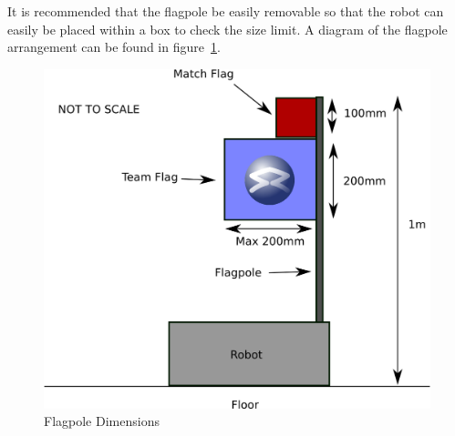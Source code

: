 It is recommended that the flagpole be easily removable so that the robot can easily be placed within a box to check the size limit.  A diagram of the flagpole arrangement can be found in figure~\ref{fig:flag}.

\begin{figure}
\begin{center}
\includegraphics[keepaspectratio, scale =1]{./images/flag.png}
\caption{\label{fig:flag}Flagpole Dimensions}
\end{center}
\end{figure}
